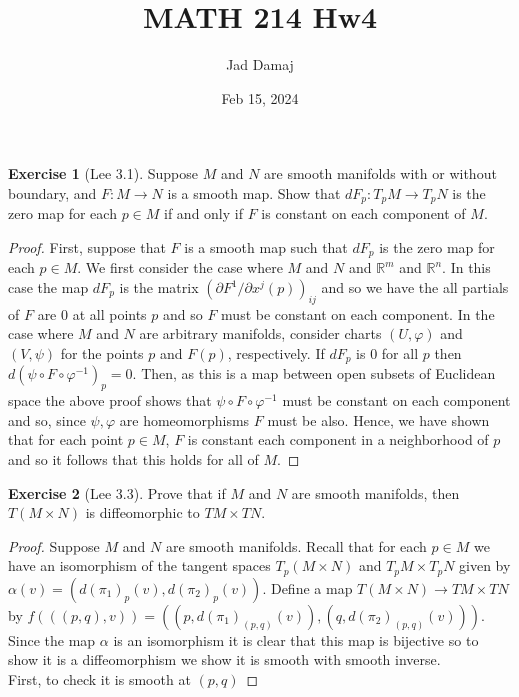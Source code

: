 \documentclass{article}
\title{MATH 214 Hw4}
\author{Jad Damaj}
\date{Feb 15, 2024}
\newcommand{\bR}{\mathbb{R}}
\newcommand{\vp}{\varphi}
\theoremstyle{definition}
\newtheorem{exercise}{Exercise}
\begin{document}
\maketitle

\begin{exercise}[Lee 3.1]
    Suppose $M$ and $N$ are smooth manifolds with or without boundary, and $F: M \to N$ is a smooth map. Show that $dF_p: T_p M \to T_p N$ is the zero map for each $p \in M$ if and only if $F$ is constant on each component of $M$. 
\end{exercise}

\begin{proof}
    First, suppose that $F$ is a smooth map such that $dF_p$ is the zero map for each $p \in M$. We first consider the case where $M$ and $N$ and $\bR^m$ and $\bR^n$. In this case the map $dF_p$ is the matrix $( \partial F^1/ \partial x^j(p))_{ij}$ and so we have the all partials of $F$ are 0 at all points $p$ and so $F$ must be constant on each component. In the case where $M$ and $N$ are arbitrary manifolds, consider charts $(U, \vp)$ and $(V, \psi)$ for the points $p$ and $F(p)$, respectively. If $dF_p$ is 0 for all $p$ then $d(\psi \circ F\circ \vp^{-1})_p = 0$. Then, as this is a map between open subsets of Euclidean space the above proof shows that $\psi \circ F \circ \vp^{-1}$ must be constant on each component and so, since $\psi, \vp$ are homeomorphisms $F$ must be also. Hence, we have shown that for each point $p \in M$, $F$ is constant each component in a neighborhood of $p$ and so it follows that this holds for all of $M$. 
\end{proof}

\begin{exercise}[Lee 3.3]
    Prove that if $M$ and $N$ are smooth manifolds, then $T(M \times N)$ is diffeomorphic to $TM \times TN$. 
\end{exercise}

\begin{proof}
    Suppose $M$ and $N$ are smooth manifolds. Recall that for each $p \in M$ we have an isomorphism of the tangent spaces $T_p(M \times N)$ and $T_p M \times T_p N$ given by $\alpha(v) = (d(\pi_1)_p(v), d(\pi_2)_p(v))$. Define a map $T(M \times N) \to T M \times TN$ by $f (((p,q), v)) = ( (p, d(\pi_1)_{(p,q)} (v)), (q, d(\pi_2)_{(p,q)}(v)))$. Since the map $\alpha$ is an isomorphism it is clear that this map is bijective so to show it is a diffeomorphism we show it is smooth with smooth inverse. \\ 
    First, to check it is smooth at $(p,q)$ 
\end{proof}
\end{document}
